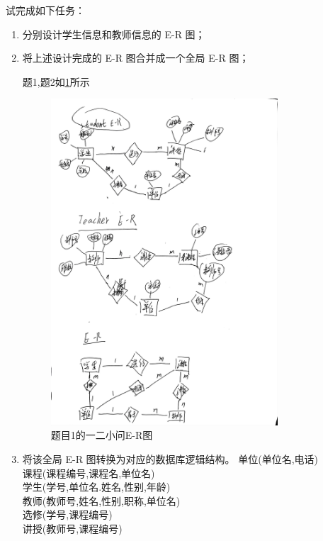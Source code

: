 \documentclass[a4paper,12pt,UTF8,fontset=none]{ctexart}
\begin{document}
   试完成如下任务：
   
   \begin{enumerate}
       \item 分别设计学生信息和教师信息的 E-R 图；
       \item 将上述设计完成的 E-R 图合并成一个全局 E-R 图；
       \par 题1,题2如\cref{图5-1}所示
       \FloatBarrier
       \begin{figure}[htbp]
        \centering
        \includegraphics[width=0.8\textwidth]{./static/images/题1-E-R图.jpg}
        \caption{题目1的一二小问E-R图}
        \label{图5-1}
    \end{figure}
    \FloatBarrier
       \item 将该全局 E-R 图转换为对应的数据库逻辑结构。
      单位(单位名,电话)\\
      课程(课程编号,课程名,单位名)\\
      学生(学号,单位名.姓名,性别,年龄)\\
      教师(教师号,姓名,性别,职称,单位名)\\
      选修(学号,课程编号)\\
      讲授(教师号,课程编号)\\
   \end{enumerate}
\end{document}
